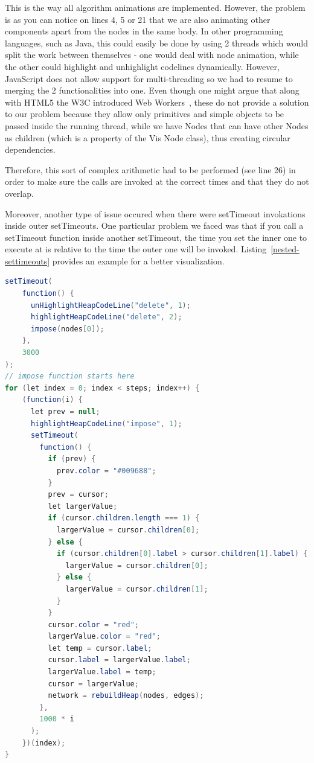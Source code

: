 \documentclass{l4proj}
\begin{document}
This is the way all algorithm animations are implemented. However, the problem is as you can notice on lines 4, 5 or 21
that we are also animating other components apart from the nodes in the same body. In other programming languages, such as Java, this
could easily be done by using 2 threads which would split the work between themselves - one would deal with node
animation, while the other could highlight and unhighlight codelines dynamically. However, JavaScript does not allow
support for multi-threading so we had to resume to merging the 2 functionalities into one. Even though one might argue
that along with HTML5 the W3C introduced Web Workers~\cite{web-worker}, these do not provide a solution to our problem
because they allow only primitives and simple objects to be passed inside the running thread, while we have Nodes that
can have other Nodes as children (which is a property of the Vis Node class), thus creating circular dependencies.

Therefore, this sort of complex arithmetic had to be performed (see line 26) in order to make sure the calls are invoked at
the correct times and that they do not overlap.

Moreover, another type of issue occured when there were setTimeout invokations inside outer setTimeouts. One particular
problem we faced was that if you call a setTimeout function inside another setTimeout, the time you set the inner one
to execute at is relative to the time the outer one will be invoked. Listing~\ref{nested-settimeouts} provides an example for a better
visualization.

\begin{lstlisting}[language={Java}, label={nested-settimeouts}, caption={Heap animation that uses nested setTimeouts.}]
setTimeout(
    function() {
      unHighlightHeapCodeLine("delete", 1);
      highlightHeapCodeLine("delete", 2);
      impose(nodes[0]);
    },
    3000
);
// impose function starts here
for (let index = 0; index < steps; index++) {
    (function(i) {
      let prev = null;
      highlightHeapCodeLine("impose", 1);
      setTimeout(
        function() {
          if (prev) {
            prev.color = "#009688";
          }
          prev = cursor;
          let largerValue;
          if (cursor.children.length === 1) {
            largerValue = cursor.children[0];
          } else {
            if (cursor.children[0].label > cursor.children[1].label) {
              largerValue = cursor.children[0];
            } else {
              largerValue = cursor.children[1];
            }
          }
          cursor.color = "red";
          largerValue.color = "red";
          let temp = cursor.label;
          cursor.label = largerValue.label;
          largerValue.label = temp;
          cursor = largerValue;
          network = rebuildHeap(nodes, edges);
        },
        1000 * i
      );
    })(index);
}
\end{lstlisting}
\end{document}
